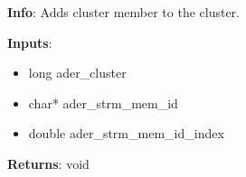 \textbf{Info}: Adds cluster member to the cluster. 

\noindent \textbf{Inputs}:
\begin{itemize}
\item{long ader\_cluster}
\item{char* ader\_strm\_mem\_id}
\item{double ader\_strm\_mem\_id\_index}
\end{itemize}

\noindent \textbf{Returns}: void
